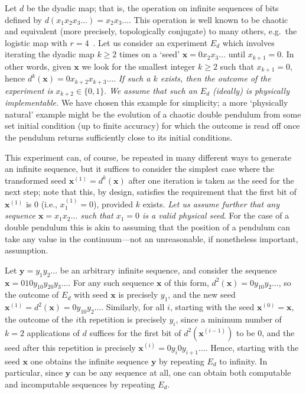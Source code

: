 \documentclass[%
 superscriptaddress,
 preprint,
 showpacs,
 showkeys,
 preprintnumbers,
 nofootinbib,
  amsmath,amssymb,
  aps,
 pra,
  longbibliography,
  floatfix,
 ]{revtex4-1}
\theoremstyle{definition}
\newcommand{\x}{\mathbf{x}}
\newcommand{\y}{\mathbf{y}}
\begin{document}
Let $d$ be the dyadic map; that is, the operation on  infinite sequences of bits defined by $d(x_1 x_2 x_3\dots)= x_2 x_3\dots$.
This operation is well known to be chaotic and equivalent (more precisely, topologically conjugate) to many others, e.g.~the logistic map with $r=4$~\cite{Devaney-1989}.
Let us consider an experiment $E_d$ which involves iterating the dyadic map $k\ge 2$ times on a `seed' $\x=0 x_2 x_3\dots$ until  $x_{k+1}=0$. 
In other words, given $\x$ we look for 
the smallest integer $k\ge 2$ such that $x_{k+1}=0$, hence $d^k(\x)=0 x_{k+2} x_{k+3}\dots$.
 \emph{If such a $k$ exists, then the outcome of the experiment is }  $x_{k+2}\in\{0,1\}$.
\emph{We assume that such an $E_d$ (ideally) is physically implementable.}
We have chosen this example for simplicity;
a more `physically natural' example might be the evolution of a chaotic double pendulum from some set initial condition (up to finite accuracy) for which the outcome is read off once the pendulum returns sufficiently close to its initial conditions.

This experiment can, of course, be repeated in many different ways to generate  an infinite sequence, but it suffices to consider the simplest case where the transformed seed $\x^{(1)}=d^k(\x)$ after one iteration is taken as the seed for the next step; note that this, by design, satisfies the requirement that the first bit of $\x^{(1)}$ is 0 (i.e., $x_1^{(1)}=0$), provided $k$ exists.
\emph{Let us assume further that any sequence $\x=x_1x_2\dots$ such that $x_1=0$ is a valid physical seed}. For the case of a double pendulum this is akin to assuming that the position of a pendulum can take any value in the continuum---not an unreasonable, if nonetheless  important, assumption.

Let $\y=y_1y_2\dots$ be an arbitrary infinite sequence, and consider the sequence $\x=010y_10y_20y_3\dots$.
For any such sequence $\x$ of this form, $d^2(\x)=0y_10y_2\dots$, so the outcome of $E_d$ with seed $\x$ is precisely $y_1$, and the new seed $\x^{(1)}=d^2(\x)=0y_10y_2\dots$.
Similarly, for all $i$, starting with the seed $\x^{(0)}=\x$, the outcome of the $i$th repetition is precisely $y_i$, since a minimum number of $k=2$ applications of $d$ suffices for the first bit of $d^2(\x^{(i-1)})$ to be 0, and the seed after this repetition is precisely $\x^{(i)}=0y_i0y_{i+1}\dots$.
Hence, starting with the seed $\x$ one obtains the infinite sequence $\y$ by repeating $E_d$ to infinity.
In particular, since $\y$ can be any sequence at all, one can obtain both computable and incomputable sequences by repeating $E_d$.
\end{document}
